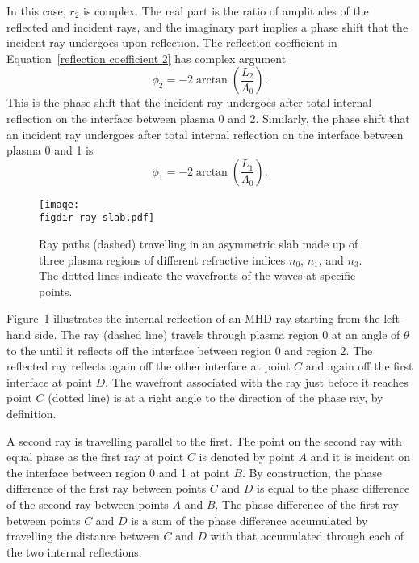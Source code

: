 \documentclass[12pt]{../style-files/ociamthesis}
\begin{document}
	In this case, $r_2$ is complex. The real part is the ratio of amplitudes of the reflected and incident rays, and the imaginary part implies a phase shift that the incident ray undergoes upon reflection. The reflection coefficient in Equation~\eqref{reflection coefficient 2} has complex argument
	\begin{equation}
	\phi_2 = -2 \arctan\left(\frac{L_2}{\Lambda_0}\right).
	\end{equation}
	This is the phase shift that the incident ray undergoes after total internal reflection on the interface between plasma 0 and 2. Similarly, the phase shift that an incident ray undergoes after total internal reflection on the interface between plasma 0 and 1 is
	\begin{equation}
	\phi_1 = -2 \arctan\left(\frac{L_1}{\Lambda_0}\right).
	\end{equation}
	
	\begin{figure}
		\centering
		\texttt{[image: \\figdir ray-slab.pdf]}
		\caption{Ray paths (dashed) travelling in an asymmetric slab made up of three plasma regions of different refractive indices $n_0$, $n_1$, and $n_3$. The dotted lines indicate the wavefronts of the waves at specific points.}
		\label{fig: ray slab}
	\end{figure}
	Figure~\ref{fig: ray slab} illustrates the internal reflection of an MHD ray starting from the left-hand side. The ray (dashed line) travels through plasma region 0 at an angle of $\theta$ to the until it reflects off the interface between region 0 and region 2. The reflected ray reflects again off the other interface at point $C$ and again off the first interface at point $D$. The wavefront associated with the ray just before it reaches point $C$ (dotted line) is at a right angle to the direction of the phase ray, by definition.
	
	A second ray is travelling parallel to the first. The point on the second ray with equal phase as the first ray at point $C$ is denoted by point $A$ and it is incident on the interface between region 0 and 1 at point $B$. By construction, the phase difference of the first ray between points $C$ and $D$ is equal to the phase difference of the second ray between points $A$ and $B$. The phase difference of the first ray between points $C$ and $D$ is a sum of the phase difference accumulated by travelling the distance between $C$ and $D$ with that accumulated through each of the two internal reflections.
	
\end{document}
